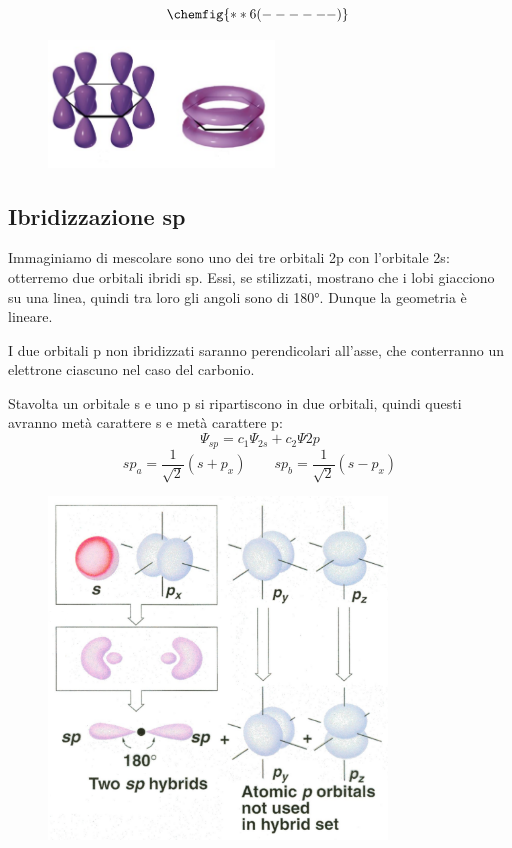 \hspace{1cm}\begin{minipage}{0.4\textwidth}
    $$
    \chemfig{**6(------)}\
    $$
\end{minipage} \hfill
\begin{minipage}{0.6\textwidth}
    \begin{figure}[H]
        \includegraphics[width=6cm]{immagini/benzene.png}
    \end{figure}
\end{minipage}

\subsection{Ibridizzazione sp}
Immaginiamo di mescolare sono uno dei tre orbitali 2p con l'orbitale 2s: otterremo due orbitali ibridi sp. Essi, se stilizzati, mostrano che i lobi giacciono su una linea, quindi tra loro gli angoli sono di 180°. Dunque la geometria è lineare.

I due orbitali p non ibridizzati saranno perendicolari all'asse, che conterranno un elettrone ciascuno nel caso del carbonio.

Stavolta un orbitale s e uno p si ripartiscono in due orbitali, quindi questi avranno metà carattere s e metà carattere p:
$$\Psi_{sp}= c_1\Psi_{2s} + c_2\Psi{2p}$$
$$
sp_a=\frac{1}{\sqrt{2}}(s + p_x)
\qquad
sp_b=\frac{1}{\sqrt{2}}(s - p_x)
$$
\begin{figure}[H]
    \centering
    \includegraphics[width=9cm]{immagini/orbitali-sp.png}
\end{figure}

